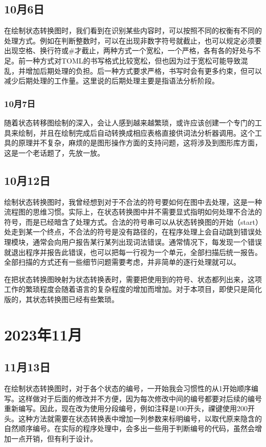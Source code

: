 \subsection{10月6日}
在绘制状态转换图时，我们看到在识别某些内容时，可以按照不同的权衡有不同的处理方式。例如在判断整数时，可以在出现非数字符号就截止，也可以规定必须要出现空格、换行符或\#才截止，两种方式一个宽松，一个严格，各有各的好处与不足。前一种方式对TOML的书写格式比较宽松，但也因为过于宽松可能导致混乱，并增加后期处理的负担。后一种方式要求严格，书写时会有更多约束，但可以减少后期处理的工作量。这里说的后期处理主要是指语法分析阶段。


\subsubsection{10月7日}
随着状态转移图绘制的深入，会让人感到越来越繁琐，或许应该创建一个专门的工具来绘制，并且在绘制完成后自动转换成相应表格直接供词法分析器调用。这个工具的原理并不复杂，麻烦的是图形操作方面的支持问题，这将涉及到图形库方面，这是一个老话题了，先放一放。


\subsection{10月12日}
绘制状态转换图时，我曾经想到对于不合法的符号要如何在图中去处理，这是一种流程图的思维习惯。实际上，在状态转换图中并不需要显式指明如何处理不合法的符号，而是已经暗含了处理方式。合法的符号串可以从状态转换图的开始（start）处走到某一个终点，不合法的符号是没有路径的，在程序处理上会自动跳到错误处理模块，通常会向用户报告某行某列出现词法错误。通常情况下，每发现一个错误就退出程序并报告此错误，也可以把每一行视为一个单元，全部扫描后统一报告。全部扫描的方式还有一些细节问题需要考虑，并非简单的逐行处理就可以。

在把状态转换图映射为状态转换表时，需要把使用到的符号、状态都列出来，这项工作的繁琐程度会随着语言的复杂程度的增加而增加。对于本项目，即使只是简化版的，其状态转换图已经有些繁琐。


\section{2023年11月}


\subsection{11月13日}
在绘制状态转换图时，对于各个状态的编号，一开始我会习惯性的从1开始顺序编写。这样做对于后面的修改并不方便，因为每次修改中间的编号都要对后续的编号重新编写。因此，现在改为使用分段编号，例如注释是100开头，祼键使用200开头。这种方法就需要在状态转换表中增加一列参数来标明编号，以取代原来隐含的自然顺序编号。在实际的程序处理中，会多出一些用于判断编号的代码，虽然会增加一点开销，但有利于设计。

